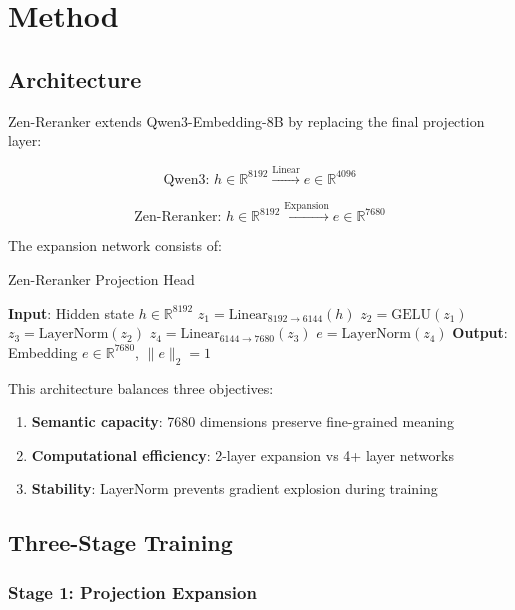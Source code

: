 \documentclass[11pt,letterpaper]{article}
\begin{document}
\section{Method}

\subsection{Architecture}

Zen-Reranker extends Qwen3-Embedding-8B by replacing the final projection layer:

\begin{equation}
\text{Qwen3: } h \in \mathbb{R}^{8192} \xrightarrow{\text{Linear}} e \in \mathbb{R}^{4096}
\end{equation}

\begin{equation}
\text{Zen-Reranker: } h \in \mathbb{R}^{8192} \xrightarrow{\text{Expansion}} e \in \mathbb{R}^{7680}
\end{equation}

The expansion network consists of:

\begin{algorithm}
\caption{Zen-Reranker Projection Head}
\begin{algorithmic}
\STATE \textbf{Input}: Hidden state $h \in \mathbb{R}^{8192}$
\STATE $z_1 = \text{Linear}_{8192 \to 6144}(h)$
\STATE $z_2 = \text{GELU}(z_1)$
\STATE $z_3 = \text{LayerNorm}(z_2)$
\STATE $z_4 = \text{Linear}_{6144 \to 7680}(z_3)$
\STATE $e = \text{LayerNorm}(z_4)$
\STATE \textbf{Output}: Embedding $e \in \mathbb{R}^{7680}$, $\|e\|_2 = 1$
\end{algorithmic}
\end{algorithm}

This architecture balances three objectives:
\begin{enumerate}
    \item \textbf{Semantic capacity}: 7680 dimensions preserve fine-grained meaning
    \item \textbf{Computational efficiency}: 2-layer expansion vs 4+ layer networks
    \item \textbf{Stability}: LayerNorm prevents gradient explosion during training
\end{enumerate}

\subsection{Three-Stage Training}

\subsubsection{Stage 1: Projection Expansion}
\end{document}
